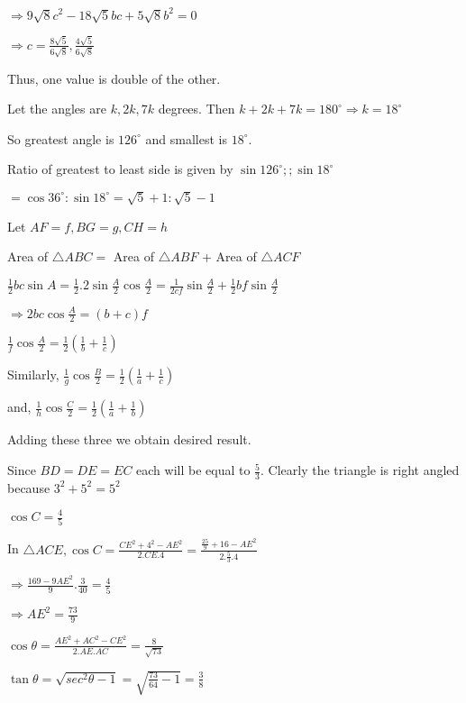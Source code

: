   $\Rightarrow 9\sqrt{8}c^2 - 18\sqrt{5}bc + 5\sqrt{8}b^2 = 0$

  $\Rightarrow c = \frac{8\sqrt{5}}{6\sqrt{8}}, \frac{4\sqrt{5}}{6\sqrt{8}}$

  Thus, one value is double of the other.

\item Let the angles are $k, 2k,7k$ degrees. Then $k + 2k + 7k = 180^\circ \Rightarrow k = 18^\circ$

  So greatest angle is $126^\circ$ and smallest is $18^\circ.$

  Ratio of greatest to least side is given by $\sin126^\circ;;\sin18^\circ$

  $= \cos 36^\circ:\sin18^\circ = \sqrt{5} + 1:\sqrt{5} - 1$

\item Let $AF = f, BG = g, CH = h$

  Area of $\triangle ABC =$ Area of $\triangle ABF$ + Area of $\triangle ACF$

  $\frac{1}{2}bc\sin A = \frac{1}{2}.2\sin\frac{A}{2}\cos\frac{A}{2} = \frac{1}{2cf}\sin\frac{A}{2} +
  \frac{1}{2}bf\sin\frac{A}{2}$

  $\Rightarrow 2bc\cos\frac{A}{2} = (b + c)f$

  $\frac{1}{f}\cos\frac{A}{2} = \frac{1}{2}\left(\frac{1}{b} + \frac{1}{c}\right)$

  Similarly, $\frac{1}{g}\cos\frac{B}{2} = \frac{1}{2}\left(\frac{1}{a} + \frac{1}{c}\right)$

  and, $\frac{1}{h}\cos\frac{C}{2} = \frac{1}{2}\left(\frac{1}{a} + \frac{1}{b}\right)$

  Adding these three we obtain desired result.

\item Since $BD = DE = EC$ each will be equal to $\frac{5}{3}.$ Clearly the triangle is right angled because $3^2 +
  5^2 = 5^2$

  $\cos C = \frac{4}{5}$

  In $\triangle ACE, \cos C = \frac{CE^2 + 4^2 - AE^2}{2.CE.4} = \frac{\frac{25}{9} + 16 - AE^2}{2.\frac{5}{3}.4}$

  $\Rightarrow  \frac{169 - 9AE^2}{9}.\frac{3}{40} = \frac{4}{5}$

  $\Rightarrow AE^2 = \frac{73}{9}$

  $\cos\theta = \frac{AE^2 + AC^2 - CE^2}{2.AE.AC} = \frac{8}{\sqrt{73}}$

  $\tan\theta = \sqrt{sec^2\theta - 1} = \sqrt{\frac{73}{64} - 1} = \frac{3}{8}$

